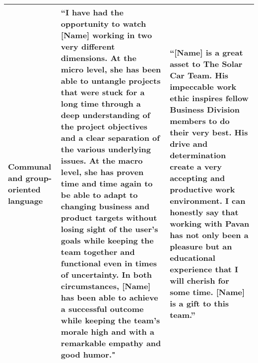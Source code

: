 \documentclass[12pt]{caltech_thesis}
\begin{document}
\begin{table}[htbp]
\begin{tabular}{|p{5cm}|p{6cm}|p{6cm}|}
       Communal and group-oriented language & “I have had the opportunity to watch [Name] working in two very different dimensions. At the micro level, she has been able to untangle projects that were stuck for a long time through a deep understanding of the project objectives and a clear separation of the various underlying issues. At the macro level, she has proven time and time again to be able to adapt to changing business and product targets without losing sight of the user's goals while keeping the team together and functional even in times of uncertainty. In both circumstances, [Name] has been able to achieve a successful outcome while keeping the team's morale high and with a remarkable empathy and good humor."  & “[Name] is a great asset to The Solar Car Team. His impeccable work ethic inspires fellow Business Division members to do their very best. His drive and determination create a very accepting and productive work environment. I can honestly say that working with Pavan has not only been a pleasure but an educational experience that I will cherish for some time. [Name] is a gift to this team.” \\
       \hline
   \end{tabular}
\end{table}
\restoregeometry
\end{document}
